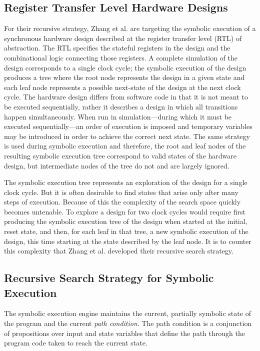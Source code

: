 \subsection{Register Transfer Level Hardware Designs}
For their recursive strategy, Zhang et al. are targeting the symbolic execution
of a synchronous hardware design described at the register transfer level (RTL)
of abstraction. The RTL specifies the stateful registers in the design and the
combinational logic connecting those registers. A complete simulation of the design
corresponds to a single clock cycle; the symbolic execution of the design
produces a tree where the root node represents the design in a given state and
each leaf node represents a possible next-state of the design at the next clock
cycle. The hardware design differs from software code in that it is not meant
to be executed sequentially, rather it describes a design in which all
transitions happen simultaneously. When run in simulation---during which it must
be executed sequentially---an order of execution
is imposed and temporary variables may be introduced in order to achieve the
correct next state. The same strategy is used during symbolic execution and therefore, the root and leaf nodes of the resulting symbolic
execution tree correspond to valid states of the hardware design, but
intermediate nodes of the tree do not and are largely ignored.

The symbolic execution tree represents an exploration of the design for a single
clock cycle. But it is often desirable to find states that arise only after many
steps of execution. Because of this the complexity of the search space quickly
becomes untenable. To explore a design for two clock cycles would require first
producing the symbolic execution tree of the design when started at the initial,
reset state, and then, for each leaf in that tree, a new symbolic execution of
the design, this time starting at the state described by the leaf node. It is to
counter this complexity that Zhang et al. developed their recursive search strategy.


\subsection{Recursive Search Strategy for Symbolic Execution}

The symbolic execution engine
maintains the current, partially symbolic state of the program and the current
\emph{path condition}. The path condition is a conjunction of propositions over
input and state variables that define the path through the program code taken to
reach the current state.


